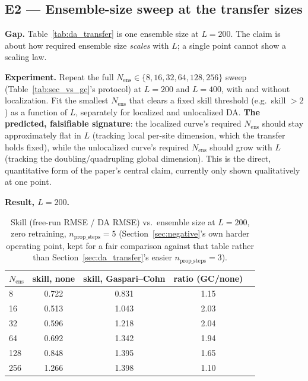 \documentclass[11pt]{article}
\begin{document}
\subsection{E2 --- Ensemble-size sweep at the transfer sizes}
\label{exp:e2}

\textbf{Gap.} Table~\ref{tab:da_transfer} is one ensemble size at
$L=200$. The claim is about how required ensemble size \emph{scales}
with $L$; a single point cannot show a scaling law.

\textbf{Experiment.} Repeat the full $N_{\mathrm{ens}} \in
\{8,16,32,64,128,256\}$ sweep (Table~\ref{tab:sec_vs_gc}'s protocol) at
$L=200$ and $L=400$, with and without localization. Fit the smallest
$N_{\mathrm{ens}}$ that clears a fixed skill threshold (e.g.\ skill
$>2$) as a function of $L$, separately for localized and unlocalized
DA. \textbf{The predicted, falsifiable signature}: the localized
curve's required $N_{\mathrm{ens}}$ should stay approximately flat in
$L$ (tracking local per-site dimension, which the transfer holds
fixed), while the unlocalized curve's required $N_{\mathrm{ens}}$
should grow with $L$ (tracking the doubling/quadrupling global
dimension). This is the direct, quantitative form of the paper's
central claim, currently only shown qualitatively at one point.

\textbf{Result, $L=200$.}

\begin{table}[h]
\centering
\begin{tabular}{lcccc}
\toprule
$N_{\mathrm{ens}}$ & skill, none & skill, Gaspari--Cohn & ratio (GC/none) \\
\midrule
8   & 0.722 & 0.831 & 1.15 \\
16  & 0.513 & 1.043 & 2.03 \\
32  & 0.596 & 1.218 & 2.04 \\
64  & 0.692 & 1.342 & 1.94 \\
128 & 0.848 & 1.395 & 1.65 \\
256 & 1.266 & 1.398 & 1.10 \\
\bottomrule
\end{tabular}
\caption{Skill (free-run RMSE / DA RMSE) vs.\ ensemble size at $L=200$,
zero retraining, $n_{\mathrm{prop\_steps}}=5$ (Section~\ref{sec:negative}'s
own harder operating point, kept for a fair comparison against that
table rather than Section~\ref{sec:da_transfer}'s easier
$n_{\mathrm{prop\_steps}}=3$).}
\label{tab:e2_result}
\end{table}
\end{document}
